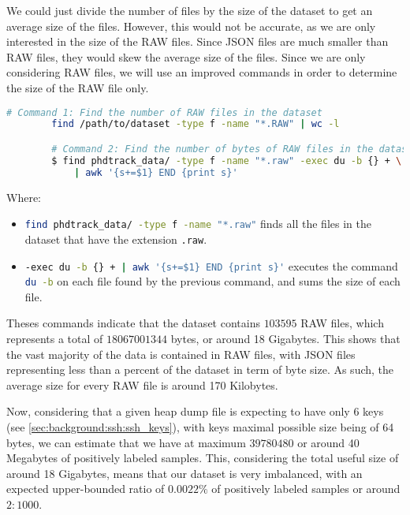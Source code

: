     We could just divide the number of files by the size of the dataset to get an average size of the files. However, this would not be accurate, as we are only interested in the size of the RAW files. Since JSON files are much smaller than RAW files, they would skew the average size of the files. Since we are only considering RAW files, we will use an improved commands in order to determine the size of the RAW file only.

    \begin{lstlisting}[language=bash]
        # Command 1: Find the number of RAW files in the dataset
        find /path/to/dataset -type f -name "*.RAW" | wc -l

        # Command 2: Find the number of bytes of RAW files in the dataset
        $ find phdtrack_data/ -type f -name "*.raw" -exec du -b {} + \
            | awk '{s+=$1} END {print s}'
    \end{lstlisting}

    Where:
    \begin{itemize}
        \item \lstinline[language=bash]!find phdtrack_data/ -type f -name "*.raw"! finds all the files in the dataset that have the extension \lstinline[language=bash]!.raw!.
        \item \lstinline[language=bash]!-exec du -b {} + | awk '{s+=$1} END {print s}'! executes the command \lstinline[language=bash]!du -b! on each file found by the previous command, and sums the size of each file.
    \end{itemize}

    Theses commands indicate that the dataset contains $ 103595 $ RAW files, which represents a total of $ 18067001344 $ bytes, or around 18 Gigabytes. This shows that the vast majority of the data is contained in RAW files, with JSON files representing less than a percent of the dataset in term of byte size. As such, the average size for every RAW file is around 170 Kilobytes. 

    Now, considering that a given heap dump file is expecting to have only 6 keys (see \autoref{sec:background:ssh:ssh_keys}), with keys maximal possible size being of 64 bytes, we can estimate that we have at maximum $ 39780480 $ or around 40 Megabytes of positively labeled samples. This, considering the total useful size of around 18 Gigabytes, means that our dataset is very imbalanced, with an expected upper-bounded ratio of $ 0.0022\% $ of positively labeled samples or around $ 2:1000 $.

